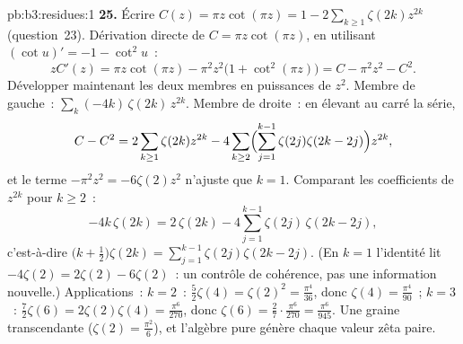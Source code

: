 \begin{solution}{pb:b3:residues:1}
\textbf{25.} Écrire $C(z) = \pi z\cot(\pi z) = 1 -
2\sum_{k\geq1}\zeta(2k)z^{2k}$ (question~23). Dérivation
directe de $C = \pi z\cot(\pi z)$, en utilisant $(\cot u)'
= -1 - \cot^2u$~:
\[
zC'(z) = \pi z\cot(\pi z) - \pi^2z^2\bigl(1 +
\cot^2(\pi z)\bigr) = C - \pi^2z^2 - C^2 .
\]
Développer maintenant les deux membres en puissances de
$z^2$. Membre de gauche~: $\sum_k(-4k)\,\zeta(2k)\,z^{2k}$.
Membre de droite~: en élevant au carré la série,
\[
C - C^2 = 2\sum_{k\geq1}\zeta(2k)z^{2k}
- 4\sum_{k\geq2}\Bigl(\sum_{j=1}^{k-1}\zeta(2j)
\zeta(2k-2j)\Bigr)z^{2k},
\]
et le terme $-\pi^2z^2 = -6\zeta(2)z^2$ n'ajuste que $k =
1$. Comparant les coefficients de $z^{2k}$ pour $k \geq 2$~:
\[
-4k\,\zeta(2k) = 2\,\zeta(2k) -
4\sum_{j=1}^{k-1}\zeta(2j)\,\zeta(2k-2j),
\]
c'est-à-dire $\bigl(k + \frac12\bigr)\zeta(2k) =
\sum_{j=1}^{k-1}\zeta(2j)\zeta(2k-2j)$. (En $k = 1$
l'identité lit $-4\zeta(2) = 2\zeta(2) - 6\zeta(2)$~: un
contrôle de cohérence, pas une information nouvelle.)
Applications~: $k = 2$~: $\frac52\zeta(4) = \zeta(2)^2 =
\frac{\pi^4}{36}$, donc $\zeta(4) = \frac{\pi^4}{90}$~; $k
= 3$~: $\frac72\zeta(6) = 2\zeta(2)\zeta(4) =
\frac{\pi^6}{270}$, donc $\zeta(6) =
\frac{2}{7}\cdot\frac{\pi^6}{270} = \frac{\pi^6}{945}$. Une
graine transcendante ($\zeta(2) = \frac{\pi^2}6$), et
l'algèbre pure génère chaque valeur zêta paire.
\end{solution}
